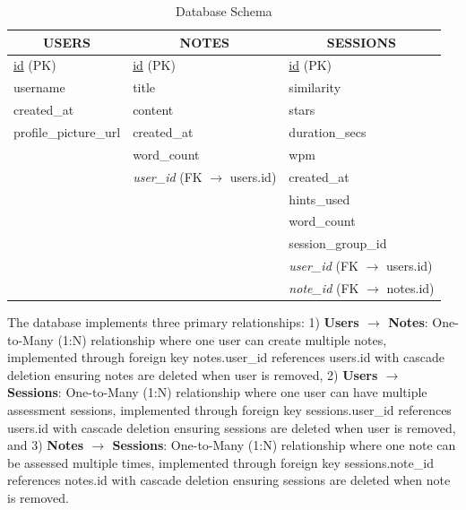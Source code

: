 {\begin{table}[H]
\centering
\caption[Database Schema]{Database Schema}
\label{tab:database-erd}
\begin{minipage}{\textwidth}
\centering
\vspace{0.5cm}

\begin{tabular}{|l|l|l|}
\hline
\multicolumn{1}{|c|}{\textbf{USERS}} & \multicolumn{1}{|c|}{\textbf{NOTES}} & \multicolumn{1}{|c|}{\textbf{SESSIONS}} \\
\hline
\underline{id} (PK) & \underline{id} (PK) & \underline{id} (PK) \\
username & title & similarity \\
created\_at & content & stars \\
profile\_picture\_url & created\_at  & duration\_secs \\
 & word\_count  & wpm \\
 &\textit{user\_id} (FK $\rightarrow$ users.id) & created\_at \\
 &  & hints\_used \\
 &  & word\_count \\
 &  & session\_group\_id \\
 &  & \textit{user\_id} (FK $\rightarrow$ users.id) \\
 &  & \textit{note\_id} (FK $\rightarrow$ notes.id) \\
\hline
\end{tabular}

\vspace{0.8cm}


\end{minipage}
\end{table}

{\color{maroon} The database implements three primary relationships: 1) \textbf{Users $\rightarrow$ Notes}: One-to-Many (1:N) relationship where one user can create multiple notes, implemented through foreign key notes.user\_id references users.id with cascade deletion ensuring notes are deleted when user is removed, 2) \textbf{Users $\rightarrow$ Sessions}: One-to-Many (1:N) relationship where one user can have multiple assessment sessions, implemented through foreign key sessions.user\_id references users.id with cascade deletion ensuring sessions are deleted when user is removed, and 3) \textbf{Notes $\rightarrow$ Sessions}: One-to-Many (1:N) relationship where one note can be assessed multiple times, implemented through foreign key sessions.note\_id references notes.id with cascade deletion ensuring sessions are deleted when note is removed.}


}
